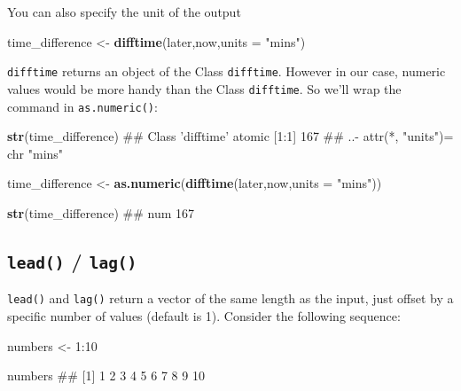 \documentclass[]{book}
\newenvironment{Shaded}{\begin{snugshade}}{\end{snugshade}}
\newcommand{\KeywordTok}[1]{\textcolor[rgb]{0.13,0.29,0.53}{\textbf{{#1}}}}
\newcommand{\DataTypeTok}[1]{\textcolor[rgb]{0.13,0.29,0.53}{{#1}}}
\newcommand{\DecValTok}[1]{\textcolor[rgb]{0.00,0.00,0.81}{{#1}}}
\newcommand{\StringTok}[1]{\textcolor[rgb]{0.31,0.60,0.02}{{#1}}}
\newcommand{\NormalTok}[1]{{#1}}
\theoremstyle{definition}
\theoremstyle{definition}
\theoremstyle{definition}
\theoremstyle{remark}
\begin{document}
You can also specify the unit of the output

\begin{Shaded}
\begin{Highlighting}[]
\NormalTok{time_difference <-}\StringTok{ }\KeywordTok{difftime}\NormalTok{(later,now,}\DataTypeTok{units =} \StringTok{"mins"}\NormalTok{)}
\end{Highlighting}
\end{Shaded}

\texttt{difftime} returns an object of the Class \texttt{difftime}.
However in our case, numeric values would be more handy than the Class
\texttt{difftime}. So we'll wrap the command in \texttt{as.numeric()}:

\begin{Shaded}
\begin{Highlighting}[]
\KeywordTok{str}\NormalTok{(time_difference)}
\NormalTok{## Class 'difftime'  atomic [1:1] 167}
\NormalTok{##   ..- attr(*, "units")= chr "mins"}
\end{Highlighting}
\end{Shaded}

\begin{Shaded}
\begin{Highlighting}[]
\NormalTok{time_difference <-}\StringTok{ }\KeywordTok{as.numeric}\NormalTok{(}\KeywordTok{difftime}\NormalTok{(later,now,}\DataTypeTok{units =} \StringTok{"mins"}\NormalTok{))}

\KeywordTok{str}\NormalTok{(time_difference)}
\NormalTok{##  num 167}
\end{Highlighting}
\end{Shaded}

\subsection{\texorpdfstring{\texttt{lead()} /
\texttt{lag()}}{lead() / lag()}}\label{lead-lag}

\texttt{lead()} and \texttt{lag()} return a vector of the same length as
the input, just offset by a specific number of values (default is 1).
Consider the following sequence:

\begin{Shaded}
\begin{Highlighting}[]
\NormalTok{numbers <-}\StringTok{ }\DecValTok{1}\NormalTok{:}\DecValTok{10}

\NormalTok{numbers}
\NormalTok{##  [1]  1  2  3  4  5  6  7  8  9 10}
\end{Highlighting}
\end{Shaded}
\end{document}
